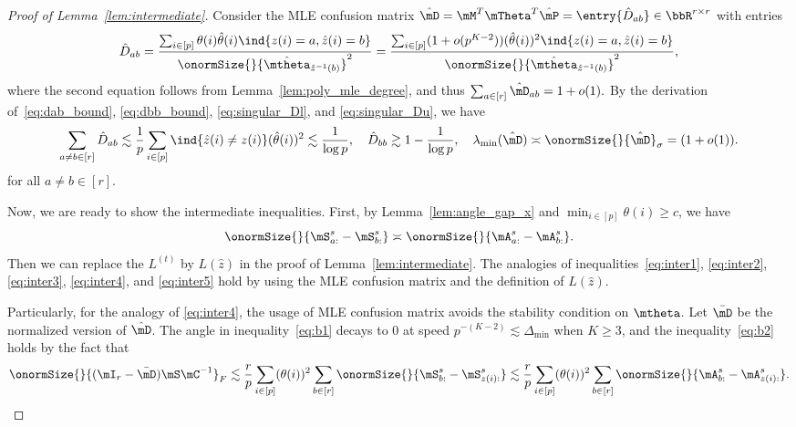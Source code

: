 \documentclass[lettersize,onecolumn,journal]{IEEEtran}
\theoremstyle{definition}
\theoremstyle{definition}
\begin{document}
\begin{proof}[Proof of Lemma~\ref{lem:intermediate}]
{        Consider the MLE confusion matrix $\hat \mD = \mM^T \mTheta^T \hat \mP = \entry{\hat D_{ab}} \in \bbR^{r \times r}$ with entries
\begin{align}\label{eq:mle_confusion}
    \hat D_{ab} = \frac{ \sum_{i \in [p]} \theta(i) \hat \theta(i) \ind\{ z(i) = a, \hat z(i) = b  \} }{\onormSize{}{\hat \mtheta_{\hat z^{-1}(b)}}^2} = \frac{ \sum_{i \in [p]} (1 + o(p^{K-2}))(\hat \theta(i))^2 \ind\{ z(i) = a, \hat z(i) = b  \} }{\onormSize{}{\hat \mtheta_{\hat z^{-1}(b)}}^2},
\end{align}
where the second equation follows from Lemma~\ref{lem:poly_mle_degree}, and thus $\sum_{a \in [r]}\hat \mD_{ab} = 1 + o(1).$ By the derivation of~\eqref{eq:dab_bound}, \eqref{eq:dbb_bound}, \eqref{eq:singular_Dl}, and \eqref{eq:singular_Du}, we have 
\begin{equation}
     \sum_{a \neq b \in [r]} \hat D_{ab} \lesssim \frac{1}{p} \sum_{i \in [p]} \ind\{ \hat z(i) \neq z(i) \} (\hat \theta(i))^2 \lesssim \frac{1}{\log p}, \quad \hat D_{bb} \gtrsim 1- \frac{1}{\log p}, \quad \lambda_{\min}(\hat \mD) \asymp \onormSize{}{\hat \mD}_{\sigma} = (1 + o(1)).
\end{equation}
for all $a \neq b \in [r]$.

Now, we are ready to show the intermediate inequalities. First, by Lemma~\ref{lem:angle_gap_x} and $\min_{ i \in [p]} \theta(i) \geq c$, we have 
\begin{equation}
    \onormSize{}{\mS_{a:}^s - \mS_{b:}^s} \asymp \onormSize{}{\mA_{a:}^s - \mA_{b:}^s}.
\end{equation}
Then we can replace the $L^{(t)}$ by $L(\hat z)$ in the proof of Lemma~\ref{lem:intermediate}. The analogies of inequalities~\eqref{eq:inter1}, \eqref{eq:inter2}, \eqref{eq:inter3},  \eqref{eq:inter4}, and \eqref{eq:inter5}  hold by using the MLE confusion matrix and the definition of $L(\hat z)$. 

Particularly, for the analogy of \eqref{eq:inter4}, the usage of MLE confusion matrix avoids the stability condition on $\mtheta$. Let $\bar \mD$ be the normalized version of $\hat \mD$. The angle in inequality~\eqref{eq:b1} decays to 0 at speed $p^{-(K-2)} \lesssim \Delta_{\min}$ when $K \geq 3$, and the inequality~\eqref{eq:b2} holds by the fact that 
\begin{equation}
    \onormSize{}{(\mI_r - \bar \mD) \mS \mC^{-1}}_F \lesssim \frac{r}{p} \sum_{i \in [p]} (\theta(i))^2 \sum_{b \in [r]} \onormSize{}{\mS_{b:}^s - \mS_{z(i):}^s} \lesssim \frac{r}{p} \sum_{i \in [p]} (\theta(i))^2 \sum_{b \in [r]} \onormSize{}{\mA_{b:}^s - \mA_{z(i):}^s}.
\end{equation}
  }     
       
    \end{proof}
    
\end{document}
